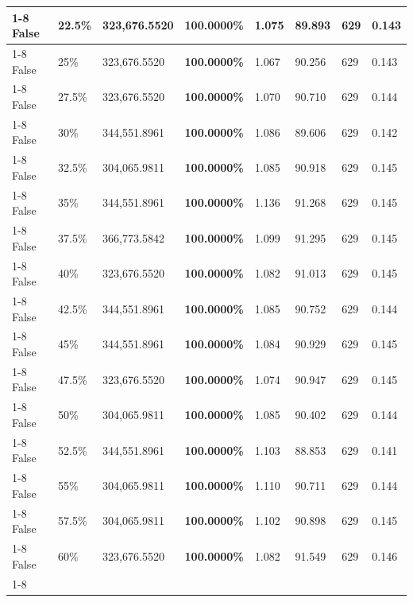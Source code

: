 \begin{table}[H]
\begin{tabular}{lllrllll}
\cline{1-8} \cline{2-8}
False & 22.5\% & 323,676.5520 & \bfseries \color{red} 100.0000\% & 1.075 & 89.893 & 629 & 0.143 \\
\cline{1-8} \cline{2-8}
False & 25\% & 323,676.5520 & \bfseries \color{red} 100.0000\% & 1.067 & 90.256 & 629 & 0.143 \\
\cline{1-8} \cline{2-8}
False & 27.5\% & 323,676.5520 & \bfseries \color{red} 100.0000\% & 1.070 & 90.710 & 629 & 0.144 \\
\cline{1-8} \cline{2-8}
False & 30\% & 344,551.8961 & \bfseries \color{red} 100.0000\% & 1.086 & 89.606 & 629 & 0.142 \\
\cline{1-8} \cline{2-8}
False & 32.5\% & 304,065.9811 & \bfseries \color{red} 100.0000\% & 1.085 & 90.918 & 629 & 0.145 \\
\cline{1-8} \cline{2-8}
False & 35\% & 344,551.8961 & \bfseries \color{red} 100.0000\% & 1.136 & 91.268 & 629 & 0.145 \\
\cline{1-8} \cline{2-8}
False & 37.5\% & 366,773.5842 & \bfseries \color{red} 100.0000\% & 1.099 & 91.295 & 629 & 0.145 \\
\cline{1-8} \cline{2-8}
False & 40\% & 323,676.5520 & \bfseries \color{red} 100.0000\% & 1.082 & 91.013 & 629 & 0.145 \\
\cline{1-8} \cline{2-8}
False & 42.5\% & 344,551.8961 & \bfseries \color{red} 100.0000\% & 1.085 & 90.752 & 629 & 0.144 \\
\cline{1-8} \cline{2-8}
False & 45\% & 344,551.8961 & \bfseries \color{red} 100.0000\% & 1.084 & 90.929 & 629 & 0.145 \\
\cline{1-8} \cline{2-8}
False & 47.5\% & 323,676.5520 & \bfseries \color{red} 100.0000\% & 1.074 & 90.947 & 629 & 0.145 \\
\cline{1-8} \cline{2-8}
False & 50\% & 304,065.9811 & \bfseries \color{red} 100.0000\% & 1.085 & 90.402 & 629 & 0.144 \\
\cline{1-8} \cline{2-8}
False & 52.5\% & 344,551.8961 & \bfseries \color{red} 100.0000\% & 1.103 & 88.853 & 629 & 0.141 \\
\cline{1-8} \cline{2-8}
False & 55\% & 304,065.9811 & \bfseries \color{red} 100.0000\% & 1.110 & 90.711 & 629 & 0.144 \\
\cline{1-8} \cline{2-8}
False & 57.5\% & 304,065.9811 & \bfseries \color{red} 100.0000\% & 1.102 & 90.898 & 629 & 0.145 \\
\cline{1-8} \cline{2-8}
False & 60\% & 323,676.5520 & \bfseries \color{red} 100.0000\% & 1.082 & 91.549 & 629 & 0.146 \\
\cline{1-8} \cline{2-8}

\end{tabular}
\end{table}
